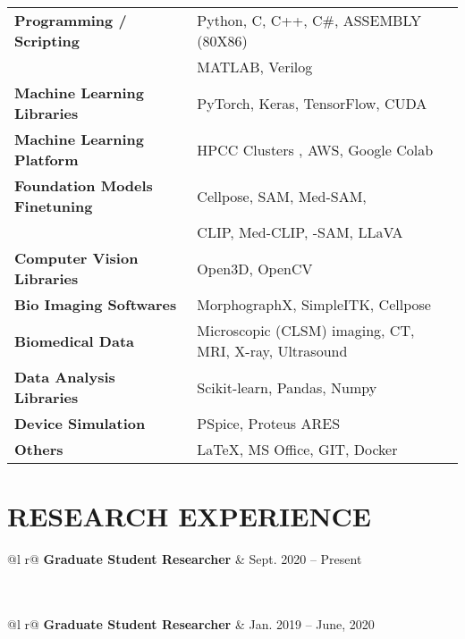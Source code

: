 \documentclass[a4paper,7 pt]{article}
\begin{document}
\begin{tabular}{ll}
\textbf{Programming / Scripting} & Python, C, C++, C\#, ASSEMBLY (80X86)\\ & MATLAB, Verilog\\

\textbf{Machine Learning Libraries} & PyTorch, Keras, TensorFlow, CUDA\\
\textbf{Machine Learning Platform} & HPCC Clusters , AWS, Google Colab \\
\textbf{Foundation Models Finetuning}& Cellpose, SAM, Med-SAM, \\ & CLIP, Med-CLIP, -SAM, LLaVA\\
\textbf{Computer Vision Libraries}& Open3D, OpenCV\\
\textbf{Bio Imaging Softwares}& MorphographX, SimpleITK, Cellpose\\
\textbf{Biomedical Data}& Microscopic (CLSM) imaging, CT, MRI, X-ray, Ultrasound\\
\textbf{Data Analysis Libraries}& Scikit-learn, Pandas, Numpy\\
\textbf{Device Simulation} & PSpice, Proteus ARES\\
\textbf{Others} & LaTeX, MS Office, GIT, Docker
\end{tabular}

\section{RESEARCH EXPERIENCE}

\begin{tabularx}{\linewidth}{ @{}l r@{} }
\textbf{Graduate Student Researcher} & \hfill Sept. 2020 – Present \\[3.75pt]
\\
 \\
\end{tabularx}
\begin{tabularx}{\linewidth}{ @{}l r@{} }
\textbf{Graduate Student Researcher} & \hfill Jan. 2019 – June, 2020 \\[3.75pt]
\\
 \\ \\
\end{tabularx}
\end{document}

